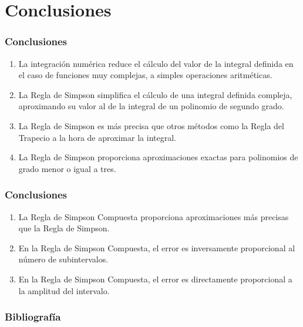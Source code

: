 \documentclass{beamer}
\begin{document}
\section{Conclusiones}

\begin{frame}
  
  \frametitle{Conclusiones}
  
  \begin{block}{}
    \begin{enumerate}[<+->]
      \item La integraci\'on num\'erica reduce el c\'alculo del valor de la integral 
      definida en el caso de funciones muy complejas, a simples operaciones aritm\'eticas.
      \item La Regla de Simpson simplifica el c\'alculo de una integral definida 
      compleja, aproximando su valor al de la integral de un polinomio de segundo 
      grado.
      \item La Regla de Simpson es m\'as precisa que otros m\'etodos como la Regla del 
      Trapecio a la hora de aproximar la integral.
      \item La Regla de Simpson proporciona aproximaciones exactas para polinomios 
      de grado menor o igual a tres.
    \end{enumerate}
 \end{block}

\end{frame}
\begin{frame}
  
  \frametitle{Conclusiones}
  
  \begin{block}{}
    \begin{enumerate}[<+->]
      \item La Regla de Simpson Compuesta proporciona aproximaciones m\'as precisas 
      que la Regla de Simpson.
      \item En la Regla de Simpson Compuesta, el error es inversamente proporcional 
      al n\'umero de subintervalos.
      \item En la Regla de Simpson Compuesta, el error es directamente proporcional 
      a la amplitud del intervalo.
    \end{enumerate}
 \end{block}

\end{frame}
\begin{frame}

  \frametitle{Bibliografía}
  
  
  
  \nocite{*}
  
\end{frame}
\end{document}
